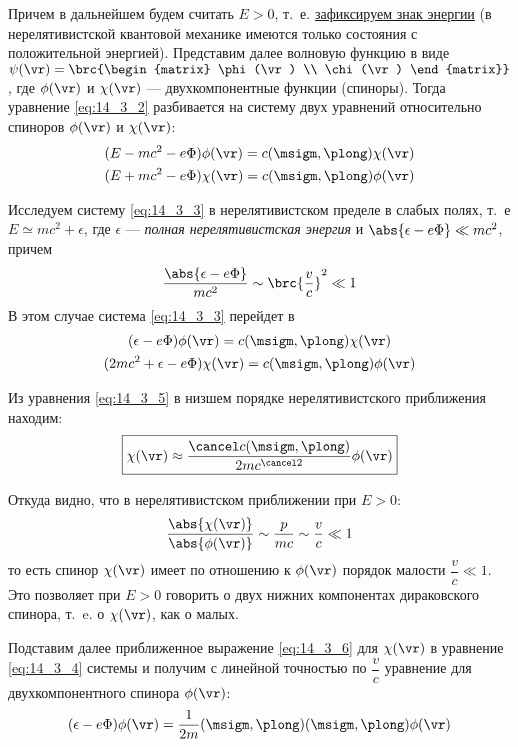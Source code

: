 Причем в дальнейшем будем считать $E>0$, т.~е. \underline{зафиксируем знак энергии} (в нерелятивистской квантовой механике имеются только состояния с положительной энергией). Представим далее волновую функцию в виде $\psi(\vr) = \brc{\begin{matrix} \phi(\vr) \\ \chi(\vr) \end{matrix}}$, где $\phi(\vr)$ и $\chi(\vr)$ --- двухкомпонентные функции (спиноры). Тогда уравнение \eqref{eq:14_3_2} разбивается на систему двух уравнений относительно спиноров $\phi(\vr)$ и $\chi(\vr)$:
\begin{gather}
\label{eq:14_3_3}
(E - mc^2 - e\Phi) \phi(\vr) = c(\msigm, \plong) \chi(\vr) \\
(E + mc^2 - e\Phi) \chi(\vr) = c(\msigm, \plong) \phi(\vr) \nonumber
\end{gather}
 
Исследуем систему \eqref{eq:14_3_3} в нерелятивистском пределе в слабых полях, т.~е $E \simeq mc^2 + \epsilon$, где $\epsilon$ --- {\em полная нерелятивистская энергия} и $\abs{\epsilon - e\Phi} \ll mc^2$, причем  
$$
\frac{\abs{\epsilon - e\Phi}}{mc^2} \sim \brc{\frac{v}{c}}^2 \ll 1
$$
В этом случае система \eqref{eq:14_3_3} перейдет в 
\begin{gather}
\label{eq:14_3_4}
(\epsilon - e\Phi) \phi(\vr) = c(\msigm, \plong) \chi(\vr) \\
\label{eq:14_3_5}
(2mc^2 + \epsilon - e\Phi) \chi(\vr) = c(\msigm, \plong) \phi(\vr)
\end{gather}

Из уравнения \eqref{eq:14_3_5} в низшем порядке нерелятивистского приближения находим:
\begin{equation}
\label{eq:14_3_6}
\boxed{\chi(\vr) \approx \frac{\cancel c (\msigm, \plong)}{2mc^{\cancel 2}} \phi(\vr)}
\end{equation}

Откуда видно, что в нерелятивистском приближении при $E > 0$:
$$
\frac{\abs{\chi(\vr)}}{\abs{\phi(\vr)}} \sim \frac{p}{mc}  \sim \frac{v}{c} \ll 1
$$
то есть спинор $\chi(\vr)$ имеет по отношению к $\phi(\vr)$ порядок малости $\dfrac{v}{c} \ll 1$. Это позволяет при $E > 0$ говорить о двух нижних компонентах дираковского спинора, т.~e. о $\chi(\vr)$, как о малых.

Подставим далее приближенное выражение \eqref{eq:14_3_6} для $\chi(\vr)$ в уравнение \eqref{eq:14_3_4} системы и получим с линейной точностью по $\dfrac{v}{c}$ уравнение для двухкомпонентного спинора $\phi(\vr)$:
\begin{equation}
\label{eq:14_3_7}
(\epsilon - e\Phi)\phi(\vr) = \frac{1}{2m}(\msigm, \plong)(\msigm, \plong) \phi(\vr)
\end{equation}

